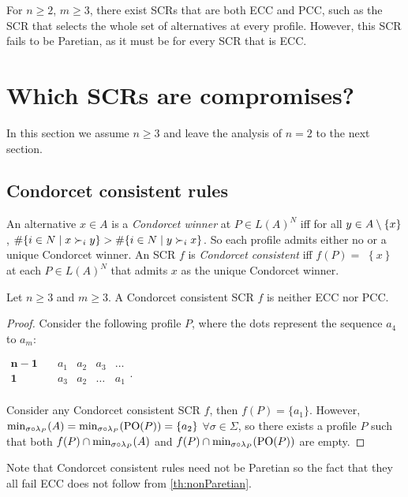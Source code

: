 \documentclass[version=3.21, pagesize, twoside=off, bibliography=totoc, DIV=calc, fontsize=12pt, a4paper]{scrartcl}
\begin{document}
\begin{remark}
	For $n ≥ 2$, $m ≥ 3$, there exist \acp{SCR} that are both ECC and PCC, such as the \ac{SCR} that selects the whole set of alternatives at every profile. However, this \ac{SCR} fails to be Paretian, as it must be for every \ac{SCR} that is ECC.
\end{remark}


\section{Which \acp{SCR} are compromises?}
\label{sec:more2voters}
In this section we assume $n\geq 3$ and leave the analysis of $n=2$ to the
next section.

\subsection{Condorcet consistent rules}

An alternative $x\in A$ is a \textit{Condorcet winner} at $P\in L(A)^{N}$ iff for all $y\in A \setminus \{x\} $, $\#\set{i \in N \suchthat x \prefi y} >\#\set{i \in N \suchthat y \prefi x}$. So each profile admits
either no or a unique Condorcet winner. An \ac{SCR} $f$ is \textit{Condorcet
consistent} iff $f(P)=$ $\left\{ x\right\} $ at each $P\in L(A)^{N}$ that
admits $x$ as the unique Condorcet winner.

\begin{theorem} \label{th:condorcet}
Let $n\geq 3$ and $m\geq 3$. A Condorcet consistent \ac{SCR} $f$ is neither ECC nor PCC.
\end{theorem}
\begin{proof}
Consider the following profile $P$, where the dots represent the sequence $a_4$ to $a_m$:
	\begin{center}
		$
		\begin{array}{cccccc}
		\mathbf{n-1} \quad &a_1&a_2&a_3&\dots\\
		\mathbf{1} \quad &a_3&a_2&\dots&a_1\\
		\end{array}
		$.
	\end{center}

Consider any Condorcet consistent \ac{SCR} $f$, then $f(P)=\{a_1\}$. However, $\musigma=\mustar=\{a_2\}$ $\forall \sigma \in \Sigma$, so there exists a profile $P$ such that both $f(P)\cap \musigma$ and $f(P)\cap \mustar$ are empty.
\end{proof}

Note that Condorcet consistent rules need not be Paretian so the fact that they all fail ECC does not follow from \cref{th:nonParetian}. 
\end{document}
